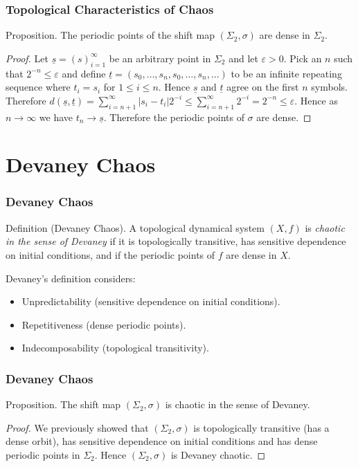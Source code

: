 \documentclass{beamer}
\begin{document}
\begin{frame}
    \frametitle{Topological Characteristics of Chaos}
    \begin{block}{Proposition.}
        The periodic points of the shift map $(\Sigma_2, \sigma)$ are dense in $\Sigma_2$. \cite{devaney}
        \begin{proof}
            Let $\underline{s} = (s)_{i=1}^{\infty}$ be an arbitrary point in $\Sigma_2$ and let $\varepsilon > 0$. Pick an $n$ such that $2^{-n} \leq \varepsilon$ and define $\underline{t} = (s_0, \dots, s_n, s_0, \dots, s_n, \dots)$ to be an infinite repeating sequence where $t_i = s_i$ for $1 \leq i \leq n$. Hence $\underline{s}$ and $\underline{t}$ agree on the first $n$ symbols. Therefore $d(\underline{s}, \underline{t}) = \sum_{i=n+1}^{\infty}|s_i - t_i|2^{-i} \leq \sum_{i = n+1}^{\infty}2^{-i} = 2^{-n} \leq \varepsilon$. Hence as $n \to \infty$ we have $t_n \to \underline{s}$. Therefore the periodic points of $\sigma$ are dense.
        \end{proof}
    \end{block}
\end{frame}

\section{Devaney Chaos}
\begin{frame}
    \frametitle{Devaney Chaos}
    \begin{block}{Definition (Devaney Chaos).}
        A topological dynamical system $(X, f)$ is \emph{chaotic in the sense of Devaney} if it is topologically transitive, has sensitive dependence on initial conditions, and if the periodic points of $f$ are dense in $X$.
    \end{block}
    \vspace{0.5cm}
    Devaney's definition considers:
    \begin{itemize}
        \item Unpredictability (sensitive dependence on initial conditions).
        \item Repetitiveness (dense periodic points).
        \item Indecomposability (topological transitivity).
    \end{itemize}
\end{frame}

\begin{frame}
    \frametitle{Devaney Chaos}
    \begin{block}{Proposition.}
        The shift map $(\Sigma_2, \sigma)$ is chaotic in the sense of Devaney.
        \begin{proof}
            We previously showed that $(\Sigma_2, \sigma)$ is topologically transitive (has a dense orbit), has sensitive dependence on initial conditions and has dense periodic points in $\Sigma_2$. Hence $(\Sigma_2, \sigma)$ is Devaney chaotic.
        \end{proof}
    \end{block}
\end{frame}
\end{document}
